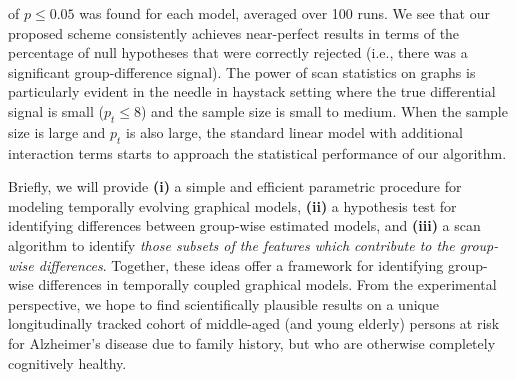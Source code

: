 of $p \leq 0.05$ was found for each model, averaged over 100 runs. 
We see that our proposed scheme consistently achieves near-perfect results in terms of the percentage of null hypotheses that 
were correctly rejected (i.e., there was a significant group-difference signal). The power of scan statistics on 
graphs is particularly evident in the needle in haystack setting where the true differential signal is small ($p_t \leq 8$)
and the sample size is small to medium. When the sample size is large and $p_t$ is also large, the standard linear model with additional interaction terms starts to approach the statistical performance of our algorithm.



Briefly, we will provide \textbf{(i)} a simple and efficient parametric procedure for modeling temporally evolving graphical models, \textbf{(ii)} a 
hypothesis test for identifying differences between group-wise estimated models, and \textbf{(iii)} a scan
algorithm to identify {\em those subsets of the features which contribute to the group-wise differences}.
Together, these ideas offer a framework for identifying group-wise differences in temporally coupled graphical models.
From the experimental perspective, we hope to find scientifically plausible results on 
a unique longitudinally tracked cohort of middle-aged (and young elderly) persons at risk for Alzheimer's disease due to family history, 
but who are otherwise completely cognitively healthy.
